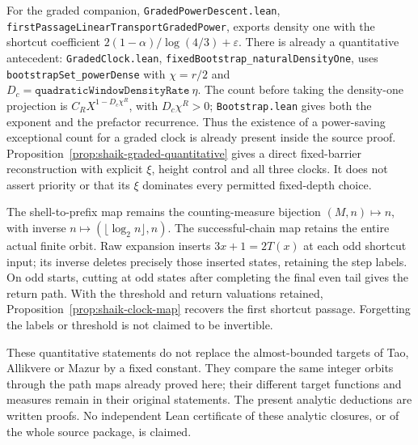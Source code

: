 \documentclass[11pt]{article}
\theoremstyle{remark}\newtheorem{remark}[proposition]{Remark}
\begin{document}
For the graded companion, \texttt{GradedPowerDescent.lean},
\texttt{firstPassageLinearTransportGradedPower}, exports density one
with the shortcut coefficient \(2(1-\alpha)/\log(4/3)+\varepsilon\).
There is already a quantitative antecedent:
\texttt{GradedClock.lean}, \texttt{fixedBootstrap\_naturalDensityOne},
uses \texttt{bootstrapSet\_powerDense} with \(\chi=r/2\) and
\(D_c=\texttt{quadraticWindowDensityRate}\ \eta\).
The count before taking the density-one projection is
\(C_R X^{1-D_c\chi^R}\), with \(D_c\chi^R>0\);
\texttt{Bootstrap.lean} gives both the exponent and the prefactor
recurrence. Thus the existence of a power-saving exceptional count
for a graded clock is already present inside the source proof.
Proposition~\ref{prop:shaik-graded-quantitative} gives a direct
fixed-barrier reconstruction with explicit \(\xi\), height control and
all three clocks. It does not assert priority or that its \(\xi\)
dominates every permitted fixed-depth choice.

The shell-to-prefix map remains the counting-measure bijection
\((M,n)\mapsto n\), with inverse \(n\mapsto(\lfloor\log_2n\rfloor,n)\).
The successful-chain map retains the entire actual finite orbit.
Raw expansion inserts \(3x+1=2T(x)\) at each odd shortcut input;
its inverse deletes precisely those inserted states, retaining the
step labels. On odd starts, cutting at odd states after completing
the final even tail gives the return path. With the threshold and
return valuations retained, Proposition~\ref{prop:shaik-clock-map}
recovers the first shortcut passage. Forgetting the labels or threshold
is not claimed to be invertible.

These quantitative statements do not replace the almost-bounded
targets of Tao, Allikvere or Mazur by a fixed constant.
They compare the same integer orbits through the path maps already
proved here; their different target functions and measures remain
in their original statements. The present analytic deductions are
written proofs. No independent Lean certificate of these analytic
closures, or of the whole source package, is claimed.
\end{document}
